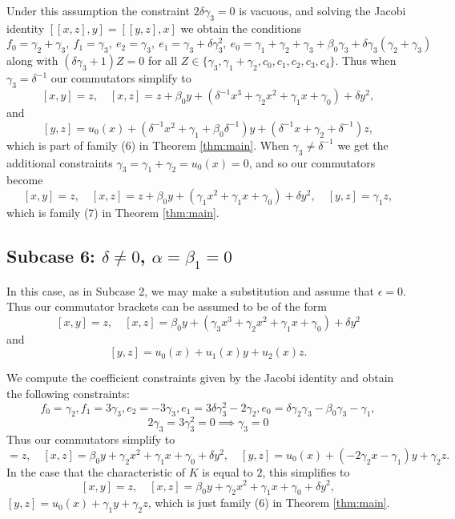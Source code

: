 \documentclass[a4paper,11pt,twoside,notitlepage,reqno]{amsart}
\theoremstyle{plain}
\numberwithin{thm}{section}
\theoremstyle{definition}
\begin{document}
Under this assumption the constraint $2\delta\gamma_3=0$ is vacuous, and solving the
Jacobi identity $[[x,z],y]=[[y,z],x]$ we obtain the conditions
$$f_0=\gamma_2+\gamma_3,\ f_1=\gamma_3,\ e_2=\gamma_3,\ e_1=\gamma_3+\delta\gamma_3^2,\ e_0=\gamma_1+\gamma_2+\gamma_3+\beta_0\gamma_3+\delta\gamma_3(\gamma_2+\gamma_3)$$
along with $(\delta\gamma_3+1)Z=0$ for all $Z\in\{\gamma_3,\gamma_1+\gamma_2,c_0,c_1,c_2,c_3,c_4\}$.
Thus when $\gamma_3=\delta^{-1}$ our commutators simplify to
$$[x,y]=z,\quad [x,z]=z + \beta_0 y + (\delta^{-1} x^3+ \gamma_2 x^2 + \gamma_1 x + \gamma_0 ) +\delta y^2,$$
and
$$[y,z] = u_0(x) + (\delta^{-1} x^2+\gamma_1+\beta_0\delta^{-1})y + (\delta^{-1} x+\gamma_2+\delta^{-1})z,$$
which is part of family (6) in Theorem \ref{thm:main}.
When $\gamma_3
\neq \delta^{-1}$ we get the additional constraints
$\gamma_3=\gamma_1+\gamma_2=u_0(x)=0$, and so our commutators become
$$[x,y]=z,\quad [x,z]=  z + \beta_0 y + ( \gamma_1 x^2 + \gamma_1 x + \gamma_0 ) +\delta y^2,\quad [y,z]= \gamma_1 z,$$
which is family (7) in Theorem \ref{thm:main}.




\subsection{Subcase 6: $\delta\neq 0$, $\alpha=\beta_1=0$}

In this case, as in Subcase 2, we may make a substitution and assume that $\epsilon=0$.
Thus our commutator brackets can be assumed to be of the form
 $$[x,y]=z,\quad [x,z]=   \beta_0 y + (\gamma_3 x^3+ \gamma_2 x^2 + \gamma_1 x + \gamma_0 ) +\delta y^2$$
and
$$[y,z]= u_0(x) + u_1(x) y + u_2(x) z.$$

We compute the coefficient constraints given by the Jacobi identity and obtain the following constraints:
$$f_0=\gamma_2, f_1=3\gamma_3, e_2=-3\gamma_3, e_1=3\delta\gamma_3^2-2\gamma_2, e_0=\delta\gamma_2\gamma_3-\beta_0\gamma_3-\gamma_1,$$
$$2\gamma_3 = 3\gamma_3^2=0 \implies \gamma_3=0$$
Thus our commutators simplify to
\begin{equation}
[x,y]=z,\quad [x,z]=\beta_0 y + \gamma_2 x^2 + \gamma_1 x + \gamma_0 +\delta y^2, \quad [y,z]=u_0(x) + (-2\gamma_2 x-\gamma_1)y +  \gamma_2 z.
\end{equation}
In the case that the characteristic of $K$ is equal to $2$, this simplifies to 
$$[x,y]=z, \quad [x,z]= \beta_0 y +  \gamma_2 x^2 + \gamma_1 x + \gamma_0 +\delta y^2,$$ $[y,z]=u_0(x)+\gamma_1y +\gamma_2 z$, which  
is just family (6) in Theorem \ref{thm:main}.
\end{document}
